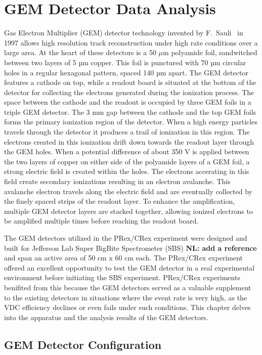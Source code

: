\chapter{GEM Detector Data Analysis}
Gas Electron Multiplier (GEM) detector technology invented by F.~Sauli~\cite{Sauli} in 1997 allows  high resolution track reconstruction under high rate conditions over a large area.  At the heart of these detectors is a 50 $\mu$m polyamide foil, sandwitched between two layers of 5 µm copper.  This foil is punctured with 70 µm circular holes in a regular hexagonal pattern, spaced 140 µm apart. The GEM detector  features a cathode on top, while a readout board is situated  at the bottom of the detector  for collecting the electrons generated during the ionization process. The space between the cathode and the readout is occupied by three GEM foils 
 in a triple GEM detector. The 3 mm gap between the cathode and the top GEM foils forms the primary  ionization region of the detector. When a high energy particles travels through the detector it produces a trail of ionization in this region. The electrons created in this ionization drift down towards the readout layer through the GEM holes. When a potential difference of about  350 V is applied between the two layers of copper on either side of the polyamide layers of a GEM foil,    a strong  electric field is created  within the holes.  The electrons accerating in this field create secondary ionizations  resulting  in an electron avalanche. This avalanche electron travels along the electric field and are  eventually collected by the finely spaced strips of the readout layer. To enhance the amplification, multiple GEM detector layers are stacked together, allowing ionized electrons to be amplified multiple times before reaching the readout board.

The GEM detectors utilized in the PRex/CRex experiment were  designed  and built for Jefferson Lab Super BigBite Spectrometer (SBS) {\bf NL: add a reference} and span an active area of 50 cm x 60 cm each.  The PRex/CRex experiment offered an excellent opportunity to test the GEM detector in a real experimental environment before initiating the SBS experiment. PRex/CRex experiments benifited from this because the GEM detectors served as a valuable supplement to the existing detectors in situations where the event rate is very high, as the VDC efficiency declines or even fails under such conditions. This chapter delves into the apparatus and the analysis results of the GEM detectors.

\section{GEM Detector Configuration}


